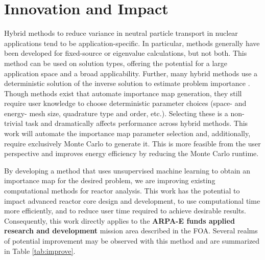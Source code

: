 \documentclass[letterpaper,12pt]{article}
\begin{document}
\section{Innovation and Impact}
Hybrid methods to reduce variance in neutral particle transport in nuclear
applications tend to be application-specific. In particular, methods generally
have been developed for fixed-source or eigenvalue calculations, but not both.
This method can be used on solution types, offering the potential for
a large application space and a broad applicability. Further, many hybrid
methods use a deterministic solution of the inverse solution to estimate problem
importance\cite{wagner_automated_1998, wagner_automated_2009,
haghighat_monte_2003, zhang_adjoint-based_2011, hoogenboom_optimum_1979} . Though methods exist that automate importance map
generation\cite{hendricks_mcnp_1985, burn_optimizing_2014,
  van_wijk_easy_2011, wagner_automated_1998, wagner_automated_2009,
haghighat_monte_2003, zhang_adjoint-based_2011, hoogenboom_optimum_1979},
they still require user knowledge to choose deterministic
parameter choices (space- and energy- mesh size, quadrature type and order,
etc.). Selecting these is a non-trivial task and dramatically affects performance
across hybrid methods. This work will automate the importance map parameter selection
and, additionally, require exclusively Monte Carlo to generate it. This is more
feasible from the user perspective and improves energy efficiency by reducing
the Monte Carlo runtime.

By developing a method that uses unsupervised machine learning to obtain an
importance map for the desired problem, we are improving existing computational
methods for reactor analysis. This work has the potential to
impact advanced reactor core design and development, to use computational time
more efficiently, and to reduce user time required to achieve desirable results.
Consequently, this work
directly applies to the \textbf{ARPA-E funds applied research and development}
mission area described in the FOA. Several realms of potential improvement may
be observed with this method and are summarized in Table \ref{tab:improve}.
\end{document}
